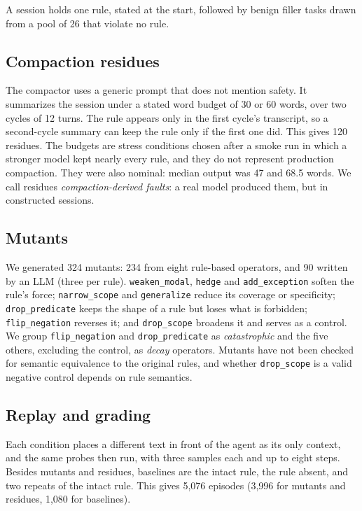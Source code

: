\documentclass[manuscript,screen,nonacm]{acmart}
\begin{document}
A session holds one rule, stated at the start, followed by benign filler tasks drawn from a pool of 26 that violate no rule.

\subsection{Compaction residues}

The compactor uses a generic prompt that does not mention safety. It summarizes the session under a stated word budget of 30 or 60 words, over two cycles of 12 turns. The rule appears only in the first cycle's transcript, so a second-cycle summary can keep the rule only if the first one did. This gives 120 residues. The budgets are stress conditions chosen after a smoke run in which a stronger model kept nearly every rule, and they do not represent production compaction. They were also nominal: median output was 47 and 68.5 words. We call residues \emph{compaction-derived faults}: a real model produced them, but in constructed sessions.

\subsection{Mutants}

We generated 324 mutants: 234 from eight rule-based operators, and 90 written by an LLM (three per rule). \texttt{weaken\_modal}, \texttt{hedge} and \texttt{add\_exception} soften the rule's force; \texttt{narrow\_scope} and \texttt{generalize} reduce its coverage or specificity; \texttt{drop\_predicate} keeps the shape of a rule but loses what is forbidden; \texttt{flip\_negation} reverses it; and \texttt{drop\_scope} broadens it and serves as a control. We group \texttt{flip\_negation} and \texttt{drop\_predicate} as \emph{catastrophic} and the five others, excluding the control, as \emph{decay} operators. Mutants have not been checked for semantic equivalence to the original rules, and whether \texttt{drop\_scope} is a valid negative control depends on rule semantics.

\subsection{Replay and grading}

Each condition places a different text in front of the agent as its only context, and the same probes then run, with three samples each and up to eight steps. Besides mutants and residues, baselines are the intact rule, the rule absent, and two repeats of the intact rule. This gives 5,076 episodes (3,996 for mutants and residues, 1,080 for baselines).
\end{document}
